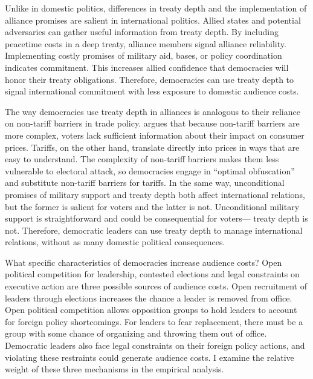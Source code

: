 \documentclass[12pt]{article}
\begin{document}
Unlike in domestic politics, differences in treaty depth and the implementation of alliance promises are salient in international politics. 
Allied states and potential adversaries can gather useful information from treaty depth. 
By including peacetime costs in a deep treaty, alliance members signal alliance reliability. 
Implementing costly promises of military aid, bases, or policy coordination indicates commitment. 
This increases allied confidence that democracies will honor their treaty obligations. 
Therefore, democracies can use treaty depth to signal international commitment with less exposure to domestic audience costs. 


The way democracies use treaty depth in alliances is analogous to their reliance on non-tariff barriers in trade policy.
\citet{Kono2006} argues that because non-tariff barriers are more complex, voters lack sufficient information about their impact on consumer prices.
Tariffs, on the other hand, translate directly into prices in ways that are easy to understand.
The complexity of non-tariff barriers makes them less vulnerable to electoral attack, so democracies engage in ``optimal obfuscation'' and substitute non-tariff barriers for tariffs. 
In the same way, unconditional promises of military support and treaty depth both affect international relations, but the former is salient for voters and the latter is not. 
Unconditional military support is straightforward and could be consequential for voters--- treaty depth is not. 
Therefore, democratic leaders can use treaty depth to manage international relations, without as many domestic political consequences.


What specific characteristics of democracies increase audience costs? 
Open political competition for leadership, contested elections and legal constraints on executive action are three possible sources of audience costs. 
Open recruitment of leaders through elections increases the chance a leader is removed from office. 
Open political competition allows opposition groups to hold leaders to account for foreign policy shortcomings. 
For leaders to fear replacement, there must be a group with some chance of organizing and throwing them out of office.
Democratic leaders also face legal constraints on their foreign policy actions, and violating these restraints could generate audience costs. 
I examine the relative weight of these three mechanisms in the empirical analysis.  
\end{document}
